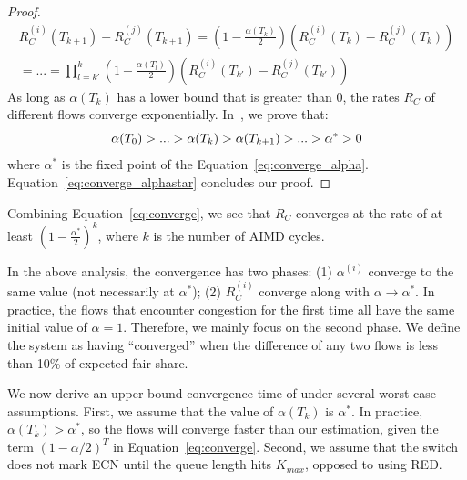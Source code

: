 \begin{proof}
\begin{equation}
\begin{array}{l}
R_C^{(i)}({T_{k + 1}}) - R_C^{(j)}({T_{k + 1}}) = \left( {1 - \frac{{\alpha ({T_k})}}{2}} \right)\left( {R_C^{(i)}({T_k}) - R_C^{(j)}({T_k})} \right)\\
 = ... = \prod\limits_{l = k'}^k {\left( {1 - \frac{{\alpha ({T_l})}}{2}} \right)} \left( {R_C^{(i)}({T_{k'}}) - R_C^{(j)}({T_{k'}})} \right)
\end{array}
\label{eq:converge}
\end{equation}
As long as $\alpha ({T_k})$ has a lower bound that is greater than 0, the rates $R_C$ of different flows 
converge exponentially. In~\cite{fullpaper}, we prove that:
\begin{equation}
\small
\alpha ({T_0}) > ... > \alpha ({T_k}) > \alpha ({T_{k + 1}}) > ... > {\alpha ^*} > 0
\label{eq:converge_alphastar}
\end{equation}
where $\alpha^{*}$ is the fixed point of the Equation~\ref{eq:converge_alpha}.
Equation~\ref{eq:converge_alphastar} concludes our proof. 
\end{proof}
Combining Equation~\ref{eq:converge}, we see that $R_C$ converges at the rate
of at least $( {1 - \frac{{{\alpha ^{*}}}}{2}} )^k$, where $k$ is the number of
AIMD cycles.

In the above analysis, the convergence has two phases: (1) $\alpha ^{(i)}$
converge to the same value (not necessarily at $\alpha^*$); (2) $R_C^{(i)}$
converge along with $\alpha \to \alpha^*$.  In practice, the flows that
encounter congestion for the first time all have the same initial value of
$\alpha = 1$.  Therefore, we mainly focus on the second phase. We define the
system as having ``converged'' when the difference of any two flows is less than
10\% of expected fair share.

We now derive an upper bound convergence time of under several worst-case
assumptions. First, we assume that the value of $\alpha ({T_k})$ is $\alpha ^*$.
In practice, $\alpha ({T_k}) > \alpha ^*$, so the flows will converge faster
than our estimation, given the term $(1 - \alpha /2)^T$ in
Equation~\ref{eq:converge}.  Second, we assume that the switch does not mark ECN
until the queue length hits $K_{max}$, opposed to using RED. 

